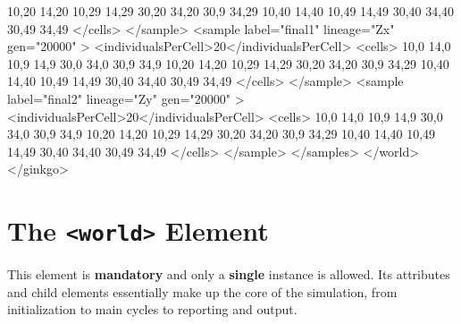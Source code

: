 \documentclass[11pt]{article}
\newcommand{\xmlelem}[1]{{\tt<\textcolor{xmlelem}{#1}>}}
\begin{document}
\begin{ginkgoxml}
                    10,20 14,20  10,29  14,29    30,20 34,20 30,9  34,29
                    10,40 14,40  10,49  14,49    30,40 34,40 30,49 34,49                
                </cells>
            </sample>                           
            <sample label="final1" lineage="Zx" gen="20000" >
                <individualsPerCell>20</individualsPerCell>
                <cells>
                    10,0  14,0   10,9   14,9     30,0  34,0  30,9  34,9     
                    10,20 14,20  10,29  14,29    30,20 34,20 30,9  34,29
                    10,40 14,40  10,49  14,49    30,40 34,40 30,49 34,49               
                </cells>
            </sample>          
            <sample label="final2" lineage="Zy" gen="20000" >
                <individualsPerCell>20</individualsPerCell>
                <cells>
                    10,0  14,0   10,9   14,9     30,0  34,0  30,9  34,9     
                    10,20 14,20  10,29  14,29    30,20 34,20 30,9  34,29
                    10,40 14,40  10,49  14,49    30,40 34,40 30,49 34,49               
                </cells>
            </sample>                        
        </samples> 
    </world>
</ginkgo>
\end{ginkgoxml}



\section{The \xmlelem{world} Element}

This element is \textbf{mandatory} and only a \textbf{single} instance is allowed.
Its attributes and child elements essentially make up the core of the simulation, from initialization to main cycles to reporting and output.
\end{document}
